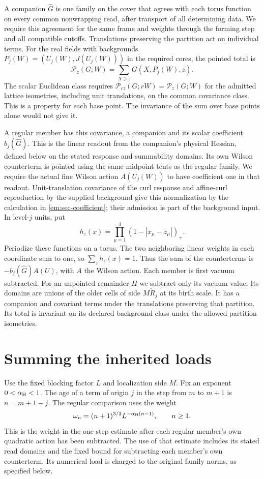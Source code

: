 \documentclass[11pt,letterpaper,reqno]{amsart}
\numberwithin{equation}{section}
\theoremstyle{definition}
\theoremstyle{remark}
\begin{document}
A companion $\widehat G$ is one family on the cover that agrees with
each torus function on every common nonwrapping read, after transport
of all determining data. We require this agreement for the same frame
and weights through the forming step and all compatible cutoffs.
Translations preserving the partition act on individual terms.
For the real fields with backgrounds
$P_j(W)=(U_j(W),J(U_j(W)))$ in the required cores, the pointed total is
\[
                   \mathcal P_z(G;W)=\sum_{X\ni z}G(X,P_j(W),z).
\]
The scalar Euclidean class requires
$\mathcal P_{rz}(G;rW)=\mathcal P_z(G;W)$ for the admitted lattice
isometries, including unit translations, on the common covariance
class. This is a property for each base point. The invariance of the
sum over base points alone would not give it.

A regular member has this covariance, a companion and its scalar
coefficient $b_j(\widehat G)$. This is the linear readout from the
companion's physical Hessian, defined below on the stated response and
summability domains. Its own Wilson counterterm is pointed using the
same midpoint tents as the regular family. We require the actual
fine Wilson action $A(U_j(W))$ to have coefficient one in that
readout. Unit-translation covariance of the curl response and
affine-curl reproduction by the supplied background give this normalization by the
calculation in \cref{em:sec-coefficient}; their admission is part of
the background input. In level-$j$ units, put
\begin{equation}\label{em:eq-tents}
                h_z(x)=\prod_{\mu=1}^4(1-|x_\mu-z_\mu|)_+.
\end{equation}
Periodize these functions on a torus. The two neighboring linear
weights in each coordinate sum to one, so $\sum_z h_z(x)=1$.
Thus the sum of the counterterms is
$-b_j(\widehat G)A(U)$, with $A$ the Wilson action. Each member is first
vacuum subtracted. For an unpointed remainder $H$ we subtract only its
vacuum value. Its domains are unions of the older cells of side
$M\check R_j$ at its birth scale. It has a companion and covariant terms
under the translations preserving that partition. Its total is invariant
on its declared background class under the allowed partition isometries.


\section{Summing the inherited loads}
\label{em:sec-loads}

Use the fixed blocking factor $L$ and localization side $M$. Fix
an exponent $0<\alpha_{\rm H}<1$. The age of a term of origin
$j$ in the step from $m$ to $m+1$ is $n=m+1-j$. The regular
comparison uses the weight
\begin{equation}\label{em:eq-regular-age}
  \omega_n=(n+1)^{3/2}L^{-\alpha_{\rm H}(n-1)},\qquad n\ge1.
\end{equation}
This is the weight in the one-step estimate after each regular
member's own quadratic action has been subtracted. The use of that
estimate includes its stated read domains and the fixed bound for
subtracting each member's own counterterm. Its numerical load is
charged to the original family norms, as specified below.
\end{document}
